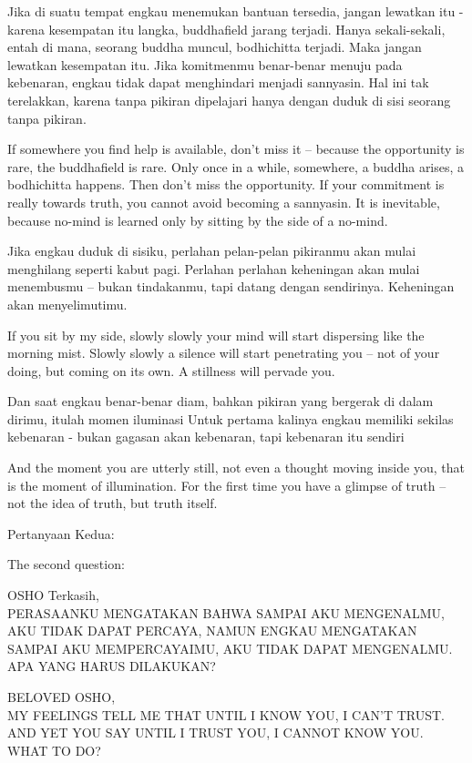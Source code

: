 \bahasa
Jika di suatu tempat engkau menemukan bantuan tersedia, jangan lewatkan itu - karena kesempatan itu langka, buddhafield jarang terjadi. Hanya sekali-sekali, entah di mana, seorang buddha muncul, bodhichitta terjadi. Maka jangan lewatkan kesempatan itu. Jika komitmenmu benar-benar menuju pada kebenaran, engkau tidak dapat menghindari menjadi sannyasin. Hal ini tak terelakkan, karena tanpa pikiran dipelajari hanya dengan duduk di sisi seorang tanpa pikiran.

\english
If somewhere you find help is available, don't miss it -- because the opportunity is rare, the buddhafield is rare. Only once in a while, somewhere, a buddha arises, a bodhichitta happens. Then don't miss the opportunity. If your commitment is really towards truth, you cannot avoid becoming a sannyasin. It is inevitable, because no-mind is learned only by sitting by the side of a no-mind.

\bahasa
Jika engkau duduk di sisiku, perlahan pelan-pelan pikiranmu akan mulai menghilang seperti kabut pagi. Perlahan perlahan keheningan akan mulai menembusmu -- bukan tindakanmu, tapi datang dengan sendirinya. Keheningan akan menyelimutimu.

\english
If you sit by my side, slowly slowly your mind will start dispersing like the morning mist. Slowly slowly a silence will start penetrating you -- not of your doing, but coming on its own. A stillness will pervade you.

\bahasa
Dan saat engkau benar-benar diam, bahkan pikiran yang bergerak di dalam dirimu, itulah momen iluminasi Untuk pertama kalinya engkau memiliki sekilas kebenaran - bukan gagasan akan kebenaran, tapi kebenaran itu sendiri

\english
And the moment you are utterly still, not even a thought moving inside you, that is the moment of illumination. For the first time you have a glimpse of truth -- not the idea of truth, but truth itself.

\bahasa
Pertanyaan Kedua:

\english
The second question:

\bahasa
OSHO Terkasih,\\
PERASAANKU MENGATAKAN BAHWA SAMPAI AKU MENGENALMU, AKU TIDAK DAPAT PERCAYA, NAMUN ENGKAU MENGATAKAN SAMPAI AKU MEMPERCAYAIMU, AKU TIDAK DAPAT MENGENALMU. APA YANG HARUS DILAKUKAN?

\english
BELOVED OSHO,\\
MY FEELINGS TELL ME THAT UNTIL I KNOW YOU, I CAN'T TRUST. AND YET YOU SAY UNTIL I TRUST YOU, I CANNOT KNOW YOU. WHAT TO DO?

